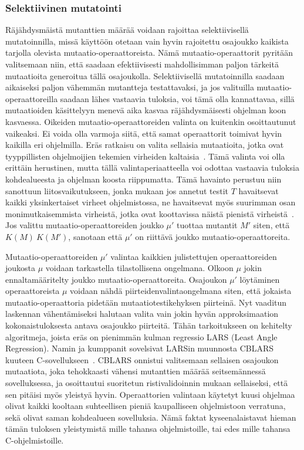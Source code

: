 \documentclass{tktltiki}
\begin{document}
\subsubsection{Selektiivinen mutatointi}
Räjähdysmäistä mutanttien määrää voidaan rajoittaa selektiivisellä mutatoinnilla, missä käyttöön otetaan vain hyvin rajoitettu osajoukko kaikista tarjolla olevista mutaatio-operaattoreista. Nämä mutaatio-operaattorit pyritään valitsemaan niin, että saadaan efektiivisesti mahdollisimman paljon tärkeitä mutaatioita generoitua tällä osajoukolla. Selektiivisellä mutatoinnilla saadaan aikaiseksi paljon vähemmän mutantteja testattavaksi, ja jos valituilla mutaatio-operaattoreilla saadaan lähes vastaavia tuloksia, voi tämä olla kannattavaa, sillä mutaatioiden käsittelyyn menevä aika kasvaa räjähdysmäisesti ohjelman koon kasvaessa. Oikeiden mutaatio-operaattoreiden valinta on kuitenkin osoittautunut vaikeaksi. Ei voida olla varmoja siitä, että samat operaattorit toimivat hyvin kaikilla eri ohjelmilla. Eräs ratkaisu on valita sellaisia mutaatioita, jotka ovat tyyppillisten ohjelmoijien tekemien virheiden kaltaisia~\cite{}. Tämä valinta voi olla erittäin herustinen, mutta tällä valintaperiaatteella voi odottaa vastaavia tuloksia kohdealueesta ja ohjelman koosta riippumatta. Tämä havainto perustuu niin sanottuun liitosvaikutukseen, jonka mukaan jos annetut testit $T$ havaitsevat kaikki yksinkertaiset virheet ohjelmistossa, ne havaitsevat myös suurimman osan monimutkaisemmista virheistä, jotka ovat koottavissa näistä pienistä virheistä~\cite{}. Jos valittu mutaatio-operaattoreiden joukko $\mu'$ tuottaa mutantit $M'$ siten, että $K(M) ~ K(M')$, sanotaan että $\mu'$ on riittävä joukko mutaatio-operaattoreita. 

Mutaatio-operaattoreiden $\mu'$ valintaa kaikkien julistettujen operaattoreiden joukosta $\mu$ voidaan tarkastella tilastollisena ongelmana. Olkoon $\mu$ jokin ennaltamääritelty joukko mutaatio-operaattoreita. Osajoukon $\mu'$ löytäminen operaattoreista $\mu$ voidaan nähdä piirteidenvalintaongelmana siten, että jokaista mutaatio-operaattoria pidetään mutaatiotestikehyksen piirteinä. Nyt vaaditun laskennan vähentämiseksi halutaan valita vain jokin hyvän approksimaation kokonaistuloksesta antava osajoukko piirteitä. Tähän tarkoitukseen on kehitelty algoritmeja, joista eräs on pienimmän kulman regressio LARS (Least Angle Regression). Namin ja kumppanit sovelsivat LARSin muunnosta CBLARS kuuteen C-sovellukseen~\cite{}. CBLARS onnistui valitsemaan sellaisen osajoukon mutaatiota, joka tehokkaasti vähensi mutanttien määrää seitsemännessä sovelluksessa, ja osoittautui suoritetun ristivalidoinnin mukaan sellaiseksi, että sen pitäisi myös yleistyä hyvin. Operaattorien valintaan käytetyt kuusi ohjelmaa olivat kaikki kooltaan suhteellisen pieniä kaupalliseen ohjelmistoon verratuna, sekä olivat saman kohdealueen sovelluksia. Nämä faktat kyseenalaistavat hieman tämän tuloksen yleistymistä mille tahansa ohjelmistoille, tai edes mille tahansa C-ohjelmistoille. 
\end{document}
